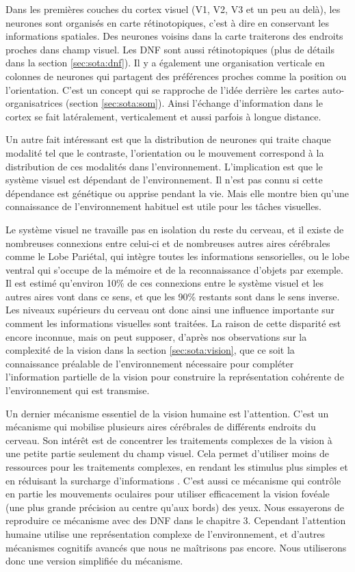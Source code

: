 	Dans les premières couches du cortex visuel (V1, V2, V3 et un peu au delà), les neurones sont organisés en carte rétinotopiques, c'est à dire en conservant les informations spatiales. Des neurones voisins dans la carte traiterons des endroits proches dans champ visuel. Les DNF sont aussi rétinotopiques (plus de détails dans la section \ref{sec:sota:dnf}). Il y a également une organisation verticale en colonnes de neurones qui partagent des préférences proches comme la position ou l'orientation. C'est un concept qui se rapproche de l'idée derrière les cartes auto-organisatrices (section \ref{sec:sota:som}). Ainsi l'échange d'information dans le cortex se fait latéralement, verticalement et aussi parfois à longue distance.

	Un autre fait intéressant est que la distribution de neurones qui traite chaque modalité tel que le contraste, l'orientation ou le mouvement correspond à la distribution de ces modalités dans l'environnement. L'implication est que le système visuel est dépendant de l'environnement. Il n'est pas connu si cette dépendance est génétique ou apprise pendant la vie. Mais elle montre bien qu'une connaissance de l'environnement habituel est utile pour les tâches visuelles.

	Le système visuel ne travaille pas en isolation du reste du cerveau, et il existe de nombreuses connexions entre celui-ci et de nombreuses autres aires cérébrales comme le Lobe Pariétal, qui intègre toutes les informations sensorielles, ou le lobe ventral qui s'occupe de la mémoire et de la reconnaissance d'objets par exemple. Il est estimé qu'environ 10\% de ces connexions entre le système visuel et les autres aires vont dans ce sens, et que les 90\% restants sont dans le sens inverse. Les niveaux supérieurs du cerveau ont donc ainsi une influence importante sur comment les informations visuelles sont traitées. La raison de cette disparité est encore inconnue, mais on peut supposer, d'après nos observations sur la complexité de la vision dans la section \ref{sec:sota:vision}, que ce soit la connaissance préalable de l'environnement nécessaire pour compléter l'information partielle de la vision pour construire la représentation cohérente de l'environnement qui est transmise.

	Un dernier mécanisme essentiel de la vision humaine est l'attention. C'est un mécanisme qui mobilise plusieurs aires cérébrales de différents endroits du cerveau. Son intérêt est de concentrer les traitements complexes de la vision à une petite partie seulement du champ visuel. Cela permet d'utiliser moins de ressources pour les traitements complexes, en rendant les stimulus plus simples et en réduisant la surcharge d'informations \cite{evans2011visual}. C'est aussi ce mécanisme qui contrôle en partie les mouvements oculaires pour utiliser efficacement la vision fovéale (une plus grande précision au centre qu'aux bords) des yeux. Nous essayerons de reproduire ce mécanisme avec des DNF dans le chapitre 3. Cependant l'attention humaine utilise une représentation complexe de l'environnement, et d'autres mécanismes cognitifs avancés que nous ne maîtrisons pas encore. Nous utiliserons donc une version simplifiée du mécanisme.
	
